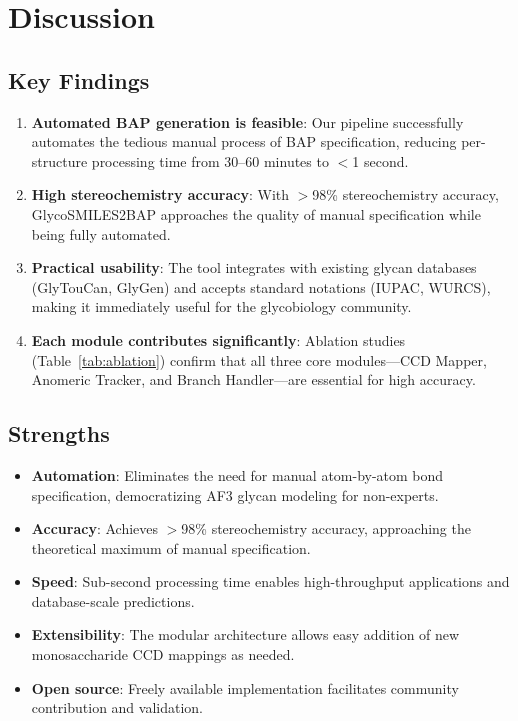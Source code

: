 \section{Discussion}

\subsection{Key Findings}

\begin{enumerate}
\item \textbf{Automated BAP generation is feasible}: Our pipeline successfully automates the tedious manual process of BAP specification, reducing per-structure processing time from 30--60 minutes to $<$1 second.

\item \textbf{High stereochemistry accuracy}: With $>$98\% stereochemistry accuracy, GlycoSMILES2BAP approaches the quality of manual specification while being fully automated.

\item \textbf{Practical usability}: The tool integrates with existing glycan databases (GlyTouCan, GlyGen) and accepts standard notations (IUPAC, WURCS), making it immediately useful for the glycobiology community.

\item \textbf{Each module contributes significantly}: Ablation studies (Table~\ref{tab:ablation}) confirm that all three core modules---CCD Mapper, Anomeric Tracker, and Branch Handler---are essential for high accuracy.
\end{enumerate}

\subsection{Strengths}

\begin{itemize}
\item \textbf{Automation}: Eliminates the need for manual atom-by-atom bond specification, democratizing AF3 glycan modeling for non-experts.

\item \textbf{Accuracy}: Achieves $>$98\% stereochemistry accuracy, approaching the theoretical maximum of manual specification.

\item \textbf{Speed}: Sub-second processing time enables high-throughput applications and database-scale predictions.

\item \textbf{Extensibility}: The modular architecture allows easy addition of new monosaccharide CCD mappings as needed.

\item \textbf{Open source}: Freely available implementation facilitates community contribution and validation.
\end{itemize}


